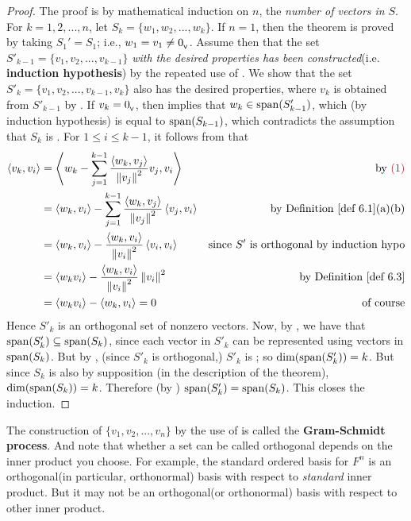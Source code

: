 \begin{proof}
The proof is by mathematical induction on \(n\), the \emph{number of vectors in} \(S\).
For \(k = 1, 2, ..., n\), let \(S_k = \{ w_1, w_2, ..., w_k \}\).
If \(n = 1\), then the theorem is proved by taking \(S_1' = S_1\); i.e., \(w_1 = v_1 \ne 0_{_{\textsf{V}}}\).
Assume then that the set \(S'_{k - 1} = \{ v_1, v_2, ..., v_{k-1} \}\) \emph{with the desired properties has been constructed}(i.e. \textbf{induction hypothesis}) by the repeated use of .
We show that the set \(S'_k = \{ v_1, v_2, ..., v_{k - 1}, v_k \}\) also has the desired properties, where \(v_k\) is obtained from \(S'_{k - 1}\) by .
If \(v_k = 0_{_{\textsf{V}}}\), then  implies that \(w_k \in \operatorname{span}(S'_{k - 1})\), which (by induction hypothesis) is equal to \(\operatorname{span}(S_{k-1})\), which contradicts the assumption that \(S_k\) is \LID{}.
For \(1 \le i \le k- 1\), it follows from  that
\begin{align*}
    \LG v_k, v_i \RG & = \LG w_k - \sum_{j = 1}^{k - 1} \frac{\LG w_k, v_j \RG}{\norm{v_j}^2} v_j, v_i \RG & \text{by \MAROON{(1)}} \\
        & = \LG w_k, v_i \RG - \sum_{j = 1}^{k - 1} \frac{\LG w_k, v_j \RG}{\norm{v_j}^2} \LG v_j, v_i \RG & \text{by \DEF{6.1}(a)(b)} \\
        & = \LG w_k, v_i \RG - \frac{\LG w_k, v_i \RG}{\norm{v_i}^2} \LG v_i, v_i \RG & \text{since \(S'\) is orthogonal by induction hypo} \\
        & = \LG w_k v_i \RG - \frac{\LG w_k, v_i \RG}{\norm{v_i}^2} \norm{v_i}^2 & \text{by \DEF{6.3}} \\
        & = \LG w_k v_i \RG - \LG w_k, v_i \RG = 0 & \text{of course}
\end{align*}
Hence \(S'_k\) is an orthogonal set of nonzero vectors.
Now, by , we have that \(\operatorname{span}(S'_k) \subseteq \operatorname{span}(S_k)\), since each vector in \(S'_k\) can be represented using vectors in \(\operatorname{span}(S_k)\).
But by , (since \(S'_k\) is orthogonal,) \(S'_k\) is \LID{}; so \(\dim(\operatorname{span}(S'_k)) = k\).
But since \(S_k\) is also \LID{} by supposition (in the description of the theorem), \(\dim(\operatorname{span}(S_k)) = k\).
Therefore (by ) \(\operatorname{span}(S'_k) = \operatorname{span}(S_k)\).
This closes the induction.
\end{proof}

\begin{remark} \label{remark 6.2.3}
The construction of \(\{ v_1, v_2, ..., v_n \}\) by the use of  is called the \textbf{Gram-Schmidt process}.
And note that whether a set can be called orthogonal depends on the inner product you choose.
For example, the standard ordered basis for \(F^n\) is an orthogonal(in particular, orthonormal) basis with respect to \emph{standard} inner product.
But it may not be an orthogonal(or orthonormal) basis with respect to other inner product.
\end{remark}

